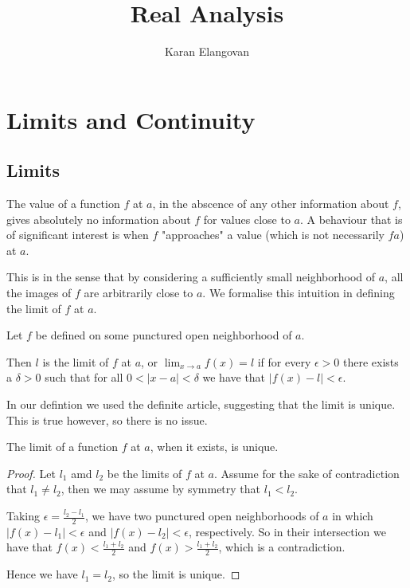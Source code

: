 \documentclass[]{article}
\title{Real Analysis}
\author{Karan Elangovan}
\begin{document}
\maketitle

\doublespacing
\tableofcontents

\section{Limits and Continuity}

\subsection{Limits}

The value of a function $f$ at $a$, in the abscence of any other information about $f$, gives absolutely no information about $f$ for values close to $a$. A behaviour that is of significant interest is when $f$ "approaches" a value (which is not necessarily $f a$) at $a$. 

This is in the sense that by considering a sufficiently small neighborhood of $a$, all the images of $f$ are arbitrarily close to $a$. We formalise this intuition in defining the limit of $f$ at $a$.

\begin{defi}[Limit]
		Let $f$ be defined on some punctured open neighborhood of $a$. 

		Then $l$ is the limit of $f$ at $a$, or $\lim_{x\to a}f(x) = l$ if for every $\epsilon > 0$ there exists a $\delta > 0$ such that for all $0 < |x-a| < \delta$ we have that $|f(x) - l| < \epsilon$.
\end{defi}

In our defintion we used the definite article, suggesting that the limit is unique. This is true however, so there is no issue. 

\begin{thm} 
	The limit of a function $f$ at $a$, when it exists, is unique.	
\end{thm}

\begin{proof}
		Let $l_1$ amd $l_2$ be the limits of $f$ at $a$. Assume for the sake of contradiction that $l_1 \neq l_2$, then we may assume by symmetry that $l_1 < l_2$. 

		Taking $\epsilon = \frac{l_2 - l_1}{2}$, we have two punctured open neighborhoods of $a$ in which $|f(x) - l_1| < \epsilon$ and $|f(x) - l_2| < \epsilon$, respectively. So in their intersection we have that $f(x) < \frac{l_1+l_2}{2}$ and $f(x) > \frac{l_1+l_2}{2}$, which is a contradiction.

		Hence we have $l_1 = l_2$, so the limit is unique.
\end{proof}
\end{document}

